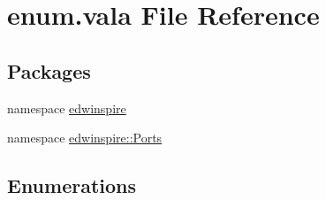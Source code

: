 \hypertarget{enum_8vala}{\section{enum.\-vala File Reference}
\label{enum_8vala}
}
\subsection*{Packages}
\begin{DoxyCompactItemize}
\item 
namespace \hyperlink{namespaceedwinspire}{edwinspire}
\item 
namespace \hyperlink{namespaceedwinspire_1_1_ports}{edwinspire\-::\-Ports}
\end{DoxyCompactItemize}
\subsection*{Enumerations}
